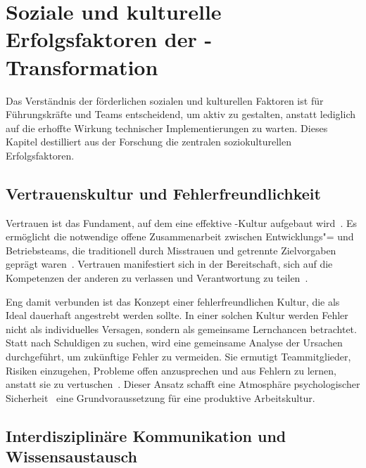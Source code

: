 \chapter{Soziale und kulturelle Erfolgsfaktoren der \DO-Transformation}
\label{ch:social-cultural-factors}

Das Verständnis der förderlichen sozialen und kulturellen Faktoren ist für Führungskräfte und Teams entscheidend, um \DO aktiv zu gestalten, anstatt lediglich auf die erhoffte Wirkung technischer Implementierungen zu warten.
Dieses Kapitel destilliert aus der Forschung die zentralen soziokulturellen Erfolgsfaktoren.

\section{Vertrauenskultur und Fehlerfreundlichkeit}

Vertrauen ist das Fundament, auf dem eine effektive \DO-Kultur aufgebaut wird~\cites[285]{kar24}[8]{aza23}[282\psq]{mas18}[228]{aza21}.
Es ermöglicht die notwendige offene Zusammenarbeit zwischen Entwicklungs"= und Betriebsteams, die traditionell durch Misstrauen und getrennte Zielvorgaben geprägt waren~\cites[128]{ham24}[527]{win23}[14343]{kha22}.
Vertrauen manifestiert sich in der Bereitschaft, sich auf die Kompetenzen der anderen zu verlassen und Verantwortung zu teilen~\cite[282]{mas18}.

Eng damit verbunden ist das Konzept einer fehlerfreundlichen Kultur, die als Ideal dauerhaft angestrebt werden sollte.
In einer solchen Kultur werden Fehler nicht als individuelles Versagen, sondern als gemeinsame Lernchancen betrachtet.
Statt nach Schuldigen zu suchen, wird eine gemeinsame Analyse der Ursachen durchgeführt, um zukünftige Fehler zu vermeiden.
Sie ermutigt Teammitglieder, Risiken einzugehen, Probleme offen anzusprechen und aus Fehlern zu lernen, anstatt sie zu vertuschen~\cites[528]{win23}[8]{san18}.
Dieser Ansatz schafft eine Atmosphäre psychologischer Sicherheit \textendash\ eine Grundvoraussetzung für eine produktive Arbeitskultur.

\section{Interdisziplinäre Kommunikation und Wissensaustausch}

